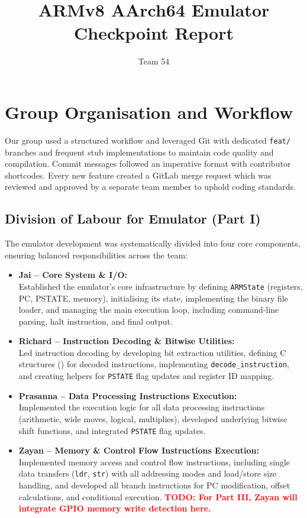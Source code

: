 \documentclass[11pt,a4paper]{article} %
\newcommand{\todo}[1]{\textcolor{red}{\textbf{TODO: #1}}}
\begin{document}
\title{ARMv8 AArch64 Emulator Checkpoint Report}
\author{Team 54}

\maketitle

\section{Group Organisation and Workflow}
\label{sec:group-organisation}

Our group used a structured workflow and leveraged Git with dedicated \texttt{feat/} branches and frequent stub implementations to maintain code quality and compilation. Commit messages followed an imperative format with contributor shortcodes. Every new feature created a GitLab merge request which was reviewed and approved by a separate team member to uphold coding standards.

\subsection{Division of Labour for Emulator (Part I)}
The emulator development was systematically divided into four core components, ensuring balanced responsibilities across the team:

\begin{itemize}[leftmargin=1.5em,noitemsep, itemsep=0.5em, parsep=0em]
    \item \textbf{Jai -- Core System \& I/O:}\\
    Established the emulator's core infrastructure by defining \texttt{ARMState} (registers, PC, PSTATE, memory), initialising its state, implementing the binary file loader, and managing the main execution loop, including command-line parsing, halt instruction, and final output.
    \item \textbf{Richard -- Instruction Decoding \& Bitwise Utilities:}\\
    Led instruction decoding by developing bit extraction utilities, defining C structures (\texttt{}) for decoded instructions, implementing \texttt{decode\_instruction}, and creating helpers for \texttt{PSTATE} flag updates and register ID mapping.
    \item \textbf{Prasanna -- Data Processing Instructions Execution:}\\
    Implemented the execution logic for all data processing instructions (arithmetic, wide moves, logical, multiplies), developed underlying bitwise shift functions, and integrated \texttt{PSTATE} flag updates.
    \item \textbf{Zayan -- Memory \& Control Flow Instructions Execution:}\\
    Implemented memory access and control flow instructions, including single data transfers (\texttt{ldr}, \texttt{str}) with all addressing modes and load/store size handling, and developed all branch instructions for PC modification, offset calculations, and conditional execution. \todo{For Part III, Zayan will integrate GPIO memory write detection here.}
\end{itemize}
\end{document}

